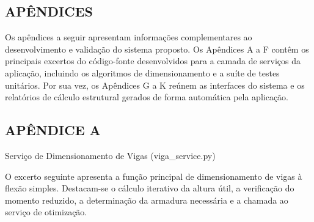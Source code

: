 \begin{center}
\section*{APÊNDICES}
\end{center}

Os apêndices a seguir apresentam informações complementares ao desenvolvimento e validação do sistema proposto. Os Apêndices A a F contêm os principais excertos do código-fonte desenvolvidos para a camada de serviços da aplicação, incluindo os algoritmos de dimensionamento e a suíte de testes unitários. Por sua vez, os Apêndices G a K reúnem as interfaces do sistema e os relatórios de cálculo estrutural gerados de forma automática pela aplicação.

\newpage
{}
\begin{center}
\section*{APÊNDICE A}
Serviço de Dimensionamento de Vigas (viga\_service.py)
\end{center}

O excerto seguinte apresenta a função principal de dimensionamento de vigas à flexão simples. Destacam-se o cálculo iterativo da altura útil, a verificação do momento reduzido, a determinação da armadura necessária e a chamada ao serviço de otimização.

